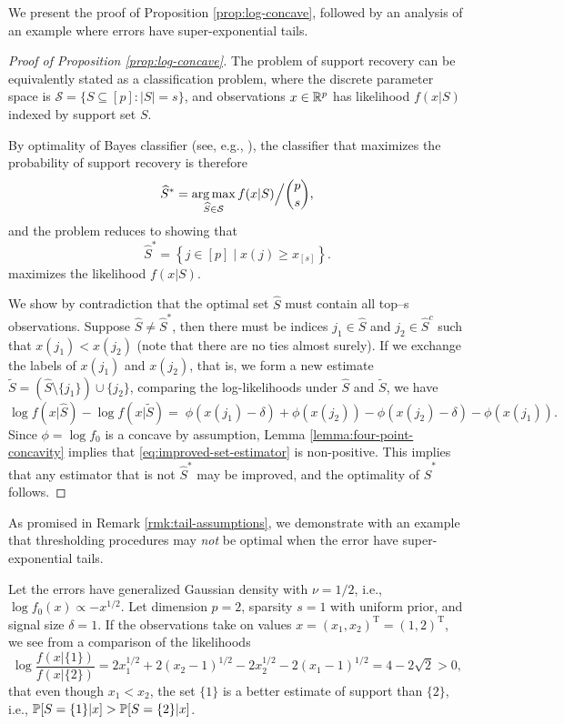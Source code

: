 We present the proof of Proposition \ref{prop:log-concave}, followed by an analysis of an example where errors have super-exponential tails.

\begin{proof}[Proof of Proposition \ref{prop:log-concave}]
The problem of support recovery can be equivalently stated as a classification problem, where the discrete parameter space is $\mathcal{S} = \{S\subseteq[p]:|S|=s\}$, and observations $x \in\R^p$ has likelihood $f(x|S)$ indexed by support set $S$.

By optimality of Bayes classifier (see, e.g., \citep{domingos1997optimality}), the classifier that maximizes the probability of support recovery is therefore
$$
\widehat{S}^* = \argmax_{\widehat{S}\in \mathcal{S}} f(x|S) \Big/ \binom{p}{s},
$$
and the problem reduces to showing that 
\begin{equation}
    \widehat{S}^* = \left\{j\in[p]\;|\;x(j) \ge x_{[s]}\right\}. \label{eq:S-hat-star}
\end{equation}
maximizes the likelihood $f(x|S)$.

We show by contradiction that the optimal set $\widehat{S}$ must contain all top--s observations. 
Suppose $\widehat{S} \neq \widehat{S}^*$, then there must be indices $j_1 \in \widehat{S}$ and $j_2 \in \widehat{S}^c$ such that $x(j_1) < x(j_2)$ (note that there are no ties almost surely).
If we exchange the labels of $x(j_1)$ and $x(j_2)$, that is, we form a new estimate $\widetilde{S} = \left(\widehat{S}\setminus\{j_1\}\right)\cup\{j_2\}$,
comparing the log-likelihoods under $\widehat{S}$ and $\widetilde{S}$, we have
\begin{equation} \label{eq:improved-set-estimator}
    \log{f(x|\widehat{S})} - \log{f(x|\widetilde{S})} = \;\phi(x(j_1) - \delta) + \phi(x(j_2)) - \phi(x(j_2) - \delta) - \phi(x(j_1)).
\end{equation}
Since $\phi=\log{f_0}$ is a concave by assumption, Lemma \ref{lemma:four-point-concavity} implies that \eqref{eq:improved-set-estimator} is non-positive.
This implies that any estimator that is not $\widehat{S}^*$ may be improved, and the optimality of $\widehat{S}^*$ follows.
\end{proof}

As promised in Remark \ref{rmk:tail-assumptions}, we demonstrate with an example that thresholding procedures may \emph{not} be optimal when the error have super-exponential tails. 

\begin{example} \label{exmp:log-convex}
Let the errors have generalized Gaussian density with $\nu=1/2$, i.e., $\log{f_0(x)}\propto -x^{1/2}$. Let dimension $p=2$, sparsity $s=1$ with uniform prior, and signal size $\delta=1$.
If the observations take on values $x = (x_1, x_2)^\mathrm{T} = (1,2)^\mathrm{T}$, we see from a comparison of the likelihoods
$$
\log \frac{f(x|\{1\})}{f(x|\{2\})} = 2x_1^{1/2} + 2(x_2 - 1)^{1/2} - 2x_2^{1/2} - 2(x_1 - 1)^{1/2} = 4 - 2\sqrt{2} > 0,
$$
that even though $x_1<x_2$, the set $\{1\}$ is a better estimate of support than $\{2\}$, i.e., $\P[S=\{1\}|x] > \P[S=\{2\}|x]$.
\end{example}

